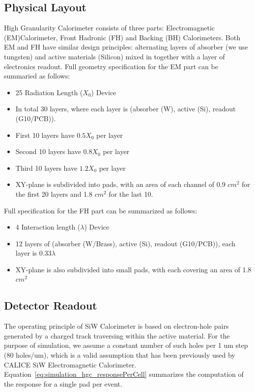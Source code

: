 \subsection{Physical Layout}
High Granularity Calorimeter consists of three parts: Electromagnetic (EM)Calorimeter, Front Hadronic (FH) and Backing (BH) Calorimeters. Both EM and FH have similar design principles: alternating layers of absorber (we use tungsten) and active materials (Silicon) mixed in together with a layer of electronics readout. Full geometry specification for the EM part can be summaried as follows:
\begin{itemize}
    \item 25 Radiation Length ($X_{0}$) Device
    \item In total 30 layers, where each layer is (absorber (W), active (Si), readout (G10/PCB)).
    \item First 10 layers have $0.5 X_{0}$ per layer
    \item Second 10 layers have $0.8 X_{0}$ per layer
    \item Third 10 layers have $1.2 X_{0}$ per layer
    \item XY-plane is subdivided into pads, with an area of each channel of 0.9 $cm^2$ for the first 20 layers and 1.8 $cm^2$ for the last 10.
\end{itemize}
Full specification for the FH part can be summarized as follows:
\begin{itemize}
    \item 4 Interaction length ($\lambda$) Device
    \item 12 layers of (absorber (W/Brass), active (Si), readout (G10/PCB)), each layer is $0.33\lambda$
    \item XY-plane is also subdivided into small pads, with each covering an area of 1.8 $cm^2$
\end{itemize}

\subsection{Detector Readout} \label{subsection:simulations_hgc_readout}
The operating principle of SiW Calorimeter is based on electron-hole pairs generated by a charged track traversing within the active material. For the purpose of simulation, we assume a constant number of such holes per 1 um step (80 holes/um), which is a valid assumption that has been previously used by CALICE SiW Electromagnetic Calorimeter. Equation~\ref{eq:simulation_hgc_responsePerCell} summarizes the computation of the response for a single pad per event.


